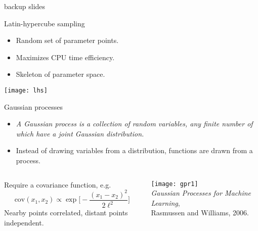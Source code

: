 \documentclass{beamer}
\begin{document}
\begin{frame}{}
  \centering
  \Large
  backup slides
\end{frame}


\begin{frame}[label=lhs]{Latin-hypercube sampling}
  \begin{itemize}
    \item Random set of parameter points.
    \item Maximizes CPU time efficiency.
    \item Skeleton of parameter space.
  \end{itemize}

  \bgs 

  \centering
  \texttt{[image: lhs]}

\end{frame}


\begin{frame}[label=gp]{Gaussian processes}


  \begin{itemize}
    \item \emph{A Gaussian process is a collection of random variables, any finite number of which have a joint Gaussian distribution.}
    \item Instead of drawing variables from a distribution, functions are drawn from a process.
  \end{itemize}



  \begin{columns}[c]
    Require a covariance function, e.g.
    \begin{equation*}
      \text{cov}(x_1,x_2) \propto \exp \biggl[ -\frac{(x_1 - x_2)^2}{2\ell^2} \biggr]
    \end{equation*}
    Nearby points correlated, distant points independent.

    \texttt{[image: gpr1]} \\[1ex]
    \raggedleft\tiny \emph{Gaussian Processes for Machine Learning}, \\ Rasmussen and Williams, 2006.
  \end{columns}

\end{frame}
\end{document}
